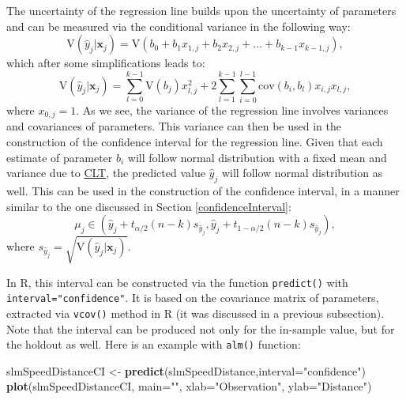 \documentclass[
]{book}
\newenvironment{Shaded}{\begin{snugshade}}{\end{snugshade}}
\newcommand{\DataTypeTok}[1]{\textcolor[rgb]{0.13,0.29,0.53}{#1}}
\newcommand{\KeywordTok}[1]{\textcolor[rgb]{0.13,0.29,0.53}{\textbf{#1}}}
\newcommand{\NormalTok}[1]{#1}
\newcommand{\StringTok}[1]{\textcolor[rgb]{0.31,0.60,0.02}{#1}}
\theoremstyle{definition}
\theoremstyle{definition}
\theoremstyle{definition}
\theoremstyle{definition}
\theoremstyle{remark}
\begin{document}
The uncertainty of the regression line builds upon the uncertainty of parameters and can be measured via the conditional variance in the following way:
\begin{equation}
    \mathrm{V}(\hat{y}_j| \mathbf{x}_j) = \mathrm{V}(b_0 + b_1 x_{1,j} + b_2 x_{2,j} + \dots + b_{k-1} x_{k-1,j}) ,
    \label{eq:regressionLineUncertaintyVariance01}
\end{equation}
which after some simplifications leads to:
\begin{equation}
    \mathrm{V}(\hat{y}_j| \mathbf{x}_j) = \sum_{l=0}^{k-1} \mathrm{V}(b_j) x^2_{l,j} + 2 \sum_{l=1}^{k-1} \sum_{i=0}^{l-1}  \mathrm{cov}(b_i,b_l) x_{i,j} x_{l,j} ,
    \label{eq:regressionLineUncertaintyVariance02}
\end{equation}
where \(x_{0,j}=1\). As we see, the variance of the regression line involves variances and covariances of parameters. This variance can then be used in the construction of the confidence interval for the regression line. Given that each estimate of parameter \(b_i\) will follow normal distribution with a fixed mean and variance due to \protect\hyperlink{CLT}{CLT}, the predicted value \(\hat{y}_j\) will follow normal distribution as well. This can be used in the construction of the confidence interval, in a manner similar to the one discussed in Section \ref{confidenceInterval}:
\begin{equation}
    \mu_j \in (\hat{y}_j + t_{\alpha/2}(n-k) s_{\hat{y}_j}, \hat{y}_j + t_{1-\alpha/2}(n-k) s_{\hat{y}_j}),
    \label{eq:confidenceIntervalRegression}
\end{equation}
where \(s_{\hat{y}_j}=\sqrt{\mathrm{V}(\hat{y}_j| \mathbf{x}_j)}\).

In R, this interval can be constructed via the function \texttt{predict()} with \texttt{interval="confidence"}. It is based on the covariance matrix of parameters, extracted via \texttt{vcov()} method in R (it was discussed in a previous subsection). Note that the interval can be produced not only for the in-sample value, but for the holdout as well. Here is an example with \texttt{alm()} function:

\begin{Shaded}
\begin{Highlighting}[]
\NormalTok{slmSpeedDistanceCI \textless{}{-}}\StringTok{ }\KeywordTok{predict}\NormalTok{(slmSpeedDistance,}\DataTypeTok{interval=}\StringTok{"confidence"}\NormalTok{)}
\KeywordTok{plot}\NormalTok{(slmSpeedDistanceCI, }\DataTypeTok{main=}\StringTok{""}\NormalTok{,}
     \DataTypeTok{xlab=}\StringTok{"Observation"}\NormalTok{, }\DataTypeTok{ylab=}\StringTok{"Distance"}\NormalTok{)}
\end{Highlighting}
\end{Shaded}
\end{document}
